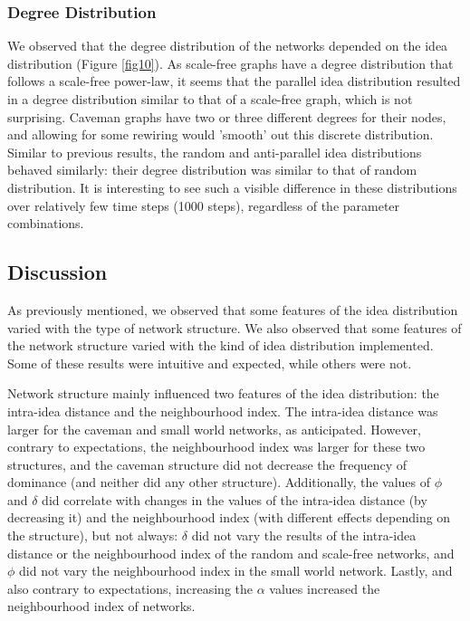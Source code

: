 \subsubsection{Degree Distribution}
We observed that the degree distribution of the networks depended on the idea distribution (Figure \ref{fig10}). As scale-free graphs have a degree distribution that follows a scale-free power-law, it seems that the parallel idea distribution resulted in a degree distribution similar to that of a scale-free graph, which is not surprising. Caveman graphs have two or three different degrees for their nodes, and allowing for some rewiring would 'smooth' out this discrete distribution. Similar to previous results, the random and anti-parallel idea distributions behaved similarly: their degree distribution was similar to that of random distribution. It is interesting to see such a visible difference in these distributions over relatively few time steps (1000 steps), regardless of the parameter combinations. 


\subsection{Discussion}

As previously mentioned, we observed that some features of the idea distribution varied with the type of network structure. We also observed that some features of the network structure varied with the kind of idea distribution implemented. Some of these results were intuitive and expected, while others were not.

Network structure mainly influenced two features of the idea distribution: the intra-idea distance and the neighbourhood index. The intra-idea distance was larger for the caveman and small world networks, as anticipated. However, contrary to expectations, the neighbourhood index was larger for these two structures, and the caveman structure did not decrease the frequency of dominance (and neither did any other structure).  Additionally, the values of $\phi$ and $\delta$ did correlate with changes in the values of the intra-idea distance (by decreasing it) and the neighbourhood index (with different effects depending on the structure), but not always: $\delta$ did not vary the results of the intra-idea distance or the neighbourhood index of the random and scale-free networks, and $\phi$ did not vary the neighbourhood index in the small world network. Lastly, and also contrary to expectations, increasing the $\alpha$ values increased the neighbourhood index of networks.


